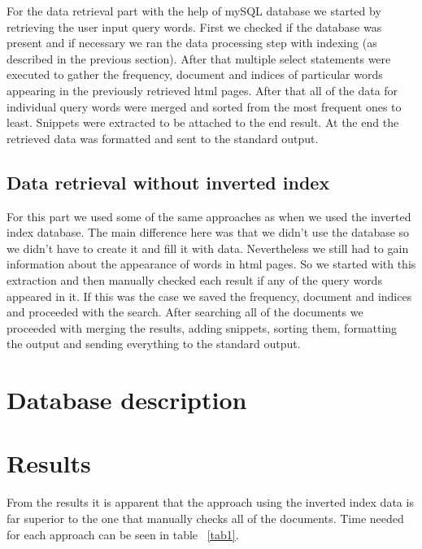 \documentclass[9pt]{IEEEtran}
\begin{document}
For the data retrieval part with the help of mySQL database we started by retrieving the user input query words.
First we checked if the database was present and if necessary we ran the data processing step with indexing (as described in the previous section).
After that multiple select statements were executed to gather the frequency, document and indices of particular words appearing in the previously retrieved html pages.
After that all of the data for individual query words were merged and sorted from the most frequent ones to least.
Snippets were extracted to be attached to the end result.
At the end the retrieved data was formatted and sent to the standard output.

\subsection{Data retrieval without inverted index}

For this part we used some of the same approaches as when we used the inverted index database.
The main difference here was that we didn't use the database so we didn't have to create it and fill it with data.
Nevertheless we still had to gain information about the appearance of words in html pages.
So we started with this extraction and then manually checked each result if any of the query words appeared in it.
If this was the case we saved the frequency, document and indices and proceeded with the search.
After searching all of the documents we proceeded with merging the results, adding snippets, sorting them, formatting the output and sending everything to the standard output.

\section{Database description}


\section{Results}

From the results it is apparent that the approach using the inverted index data is far superior to the one that manually checks all of the documents.
Time needed for each approach can be seen in table ~\ref{tab1}.
\end{document}
